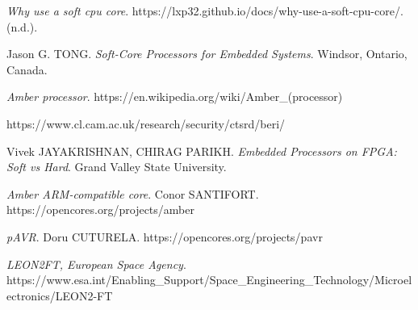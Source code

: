 \begin{thebibliography}{24}

	\textit{Why use a soft cpu core}. https://lxp32.github.io/docs/why-use-a-soft-cpu-core/. (n.d.).

	Jason G. \uppercase{Tong}. \textit{Soft-Core Processors for Embedded Systems}. Windsor, Ontario, Canada.
    
	\textit{Amber processor}. https://en.wikipedia.org/wiki/Amber\_(processor)

 https://www.cl.cam.ac.uk/research/security/ctsrd/beri/

 Vivek \uppercase{Jayakrishnan}, \uppercase{Chirag Parikh}. \textit{Embedded Processors on FPGA: Soft vs Hard}. Grand Valley State University.

 \textit{Amber ARM-compatible core}. Conor \uppercase{Santifort}. https://opencores.org/projects/amber

 \textit{pAVR}. Doru \uppercase{Cuturela}. https://opencores.org/projects/pavr

 \textit{LEON2FT, European Space Agency}. https://www.esa.int/Enabling\_Support/Space\_Engineering\_Technology/Microelectronics/LEON2-FT








\end{thebibliography}